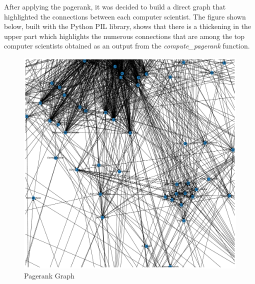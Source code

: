 \documentclass[12pt, twoside]{article}
\begin{document}
\noindent
After applying the pagerank, it was decided to build a direct graph that highlighted the connections between each computer scientist. The figure shown below, built with the Python PIL library, shows that there is a thickening in the upper part which highlights the numerous connections that are among the top computer scientists obtained as an output from the \textit{compute\_pagerank} function.

\begin{figure}[htp]
\centering
\includegraphics[width = .69\textwidth]{images/my_graph}
\caption{Pagerank Graph}
\end{figure}

\newpage
\end{document}
